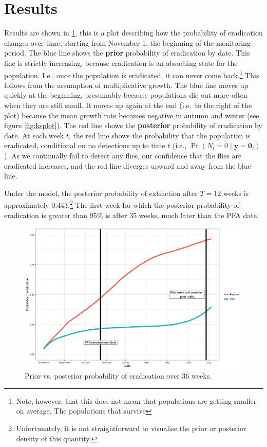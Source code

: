 \documentclass[
  oneside]{book}
\begin{document}
\hypertarget{results}{%
\section{Results}\label{results}}

Results are shown in \ref{fig:postfig}. this is a plot describing how the probability of eradication changes over time, starting from November 1, the beginning of the monitoring period. The blue line shows the \textbf{prior} probability of eradication by date. This line is strictly increasing, because eradication is an absorbing state for the population. I.e., once the population is eradicated, it can never come back.\footnote{Note, however, that this does not mean that populations are getting smaller on average. The populations that survive} This follows from the assumption of multiplicative growth. The blue line moves up quickly at the beginning, presumably because populations die out more often when they are still small. It moves up again at the end (i.e.~to the right of the plot) because the mean growth rate becomes negative in autumn and winter (see figure \ref{fig:ksplot}). The red line shows the \textbf{posterior} probability of eradication by date. At each week \(t\), the red line shows the probability that the population is eradicated, conditional on no detections up to time \(t\) (i.e., \(\Pr(N_t = 0 \mid \mathbf y = \mathbf 0_t)\)). As we continually fail to detect any flies, our confidence that the flies are eradicated increases, and the red line diverges upward and away from the blue line.

Under the model, the posterior probability of extinction after \(T=12\) weeks is approximately 0.443.\footnote{Unfortunately, it is not straightforward to visualise the prior or posterior density of this quantity.} The first week for which the posterior probability of eradication is greater than 95\% is after 35 weeks, much later than the PFA date.

\begin{figure}

{\centering \includegraphics[width=1\linewidth]{results/pfa_criteria_evaluation/prior_vs_post_plot} 

}

\caption{Prior vs. posterior probability of eradication over 36 weeks.}\label{fig:postfig}
\end{figure}
\end{document}
